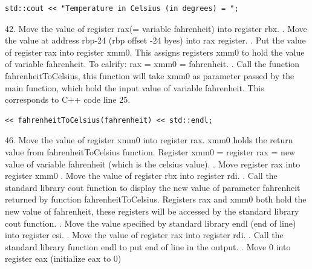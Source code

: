 \documentclass{article}
\theoremstyle{theorem}
\theoremstyle{definition}
\theoremstyle{remark}
\begin{document}
\begin{lstlisting}
std::cout << "Temperature in Celsius (in degrees) = ";
\end{lstlisting}
42. Move the value of register rax(= variable fahrenheit) into register rbx.
\newline {}. Move the value at address rbp-24 (rbp offset -24 byes) into rax register.
\newline {}. Put the value of register rax into register xmm0. This assigns registers xmm0 to hold the value of variable fahrenheit. To calrify: rax = xmm0 = fahrenheit.
\newline {}. Call the function fahrenheitToCelsius, this function will take xmm0 as parameter passed by the main function, which hold the input value of variable fahrenheit. This corresponds to C++ code line 25.
\begin{lstlisting}
<< fahrenheitToCelsius(fahrenheit) << std::endl;
\end{lstlisting}
46. Move the value of register xmm0 into register rax. xmm0 holds the return value from fahrenheitToCelsius function. Register xmm0 = register rax = new value of variable fahrenheit (which is the celsius value).
\newline {}. Move register rax into register xmm0
\newline {}. Move the value of register rbx into register rdi.
\newline {}. Call the standard library cout function to display the new value of parameter fahrenheit returned by function fahrenheitToCelsius. Registers rax and xmm0 both hold the new value of fahrenheit, these registers will be accessed by the standard library cout function.
\newline {}. Move the value specified by standard library endl (end of line) into register esi.
\newline {}. Move the value of register rax into register rdi.
\newline {}. Call the standard library function endl to put end of line in the output.
\newline {}. Move 0 into register eax (initialize eax to 0)
\end{document}
